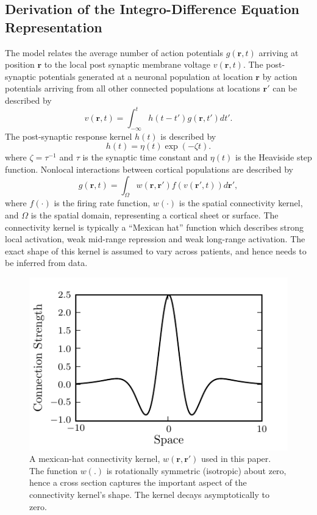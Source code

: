 \documentclass[10pt,a4paper]{article}
\begin{document}
\subsection{Derivation of the Integro-Difference Equation Representation}
The model relates the average number of action potentials $g(\mathbf{r},t)$ arriving at position $\mathbf{r}$ to the local post synaptic membrane voltage $v(\mathbf{r},t)$. The post-synaptic potentials generated at a neuronal population at location $\mathbf{r}$ by action potentials arriving from all other connected populations at locations $\mathbf{r}'$ can be described by 
\begin{equation}
	\label{SpikesToPotential} v\left( {\mathbf{r},t} \right) = \int_{ - \infty }^t {h\left( {t - t'} \right)g\left( {\mathbf{r},t'} \right)dt'}. 
\end{equation}
The post-synaptic response kernel $h(t)$ is described by 
\begin{equation}
	\label{SynapticRespKernel} h(t) = \eta(t)\exp{\left(-\zeta t\right)}. 
\end{equation}
where $\zeta=\tau^{-1}$ and $\tau$ is the synaptic time constant and $\eta(t)$ is the Heaviside step function. Nonlocal interactions between cortical populations are described by 
\begin{equation}
	\label{RateBasedInteractions} g\left( \mathbf{r},t \right) = \int_\Omega {w\left( \mathbf{r},\mathbf{r}' \right)f\left( v\left( \mathbf{r}',t \right) \right)d\mathbf{r}'}, 
\end{equation}
where $f(\cdot)$ is the firing rate function, $w(\cdot)$ is the spatial connectivity kernel, and $\Omega$ is the spatial domain, representing a cortical sheet or surface. The connectivity kernel is typically a ``Mexican hat'' function which describes strong local activation, weak mid-range repression and weak long-range activation. The exact shape of this kernel is assumed to vary across patients, and hence needs to be inferred from data.
\begin{figure}\label{fig:2d_kernel}
   	\begin{center}
   		\includegraphics{./Graph/Cross_section_kernel.pdf} 
   	\end{center}
   	\caption{A mexican-hat connectivity kernel, $w(\mathbf{r},\mathbf{r'})$ used in this paper. The function $w(.)$ is rotationally symmetric (isotropic) about zero, hence a cross section captures the important aspect of the connectivity kernel's shape. The kernel decays asymptotically to zero.} 
   \end{figure}
\end{document}
